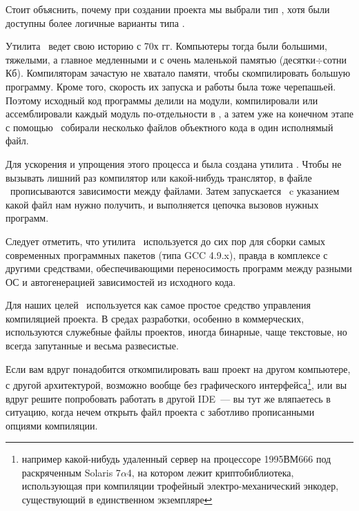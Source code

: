 \label{labmkmake}

Стоит объяснить, почему при создании проекта мы выбрали тип , хотя были доступны более логичные варианты типа .

Утилита \make\ ведет свою историю с 70х гг. Компьютеры тогда были большими,
тяжелыми, а главное медленными и с очень маленькой памятью (десятки$\div$сотни
Кб).
Компиляторам зачастую не хватало памяти, чтобы скомпилировать большую программу.
Кроме того, скорость их запуска и работы была тоже черепашьей.
Поэтому исходный код программы делили на модули, компилировали или
ассемблировали каждый модуль по-отдельности в , а затем уже
на конечном этапе с помощью \ собирали несколько файлов объектного
кода в один исполнямый файл.

Для ускорения и упрощения этого процесса и была создана утилита \make.
Чтобы не вызывать лишний раз компилятор или какой-нибудь транслятор, в файле
\makefile\ прописываются зависимости между файлами. Затем запускается \make\ c
указанием какой файл нам нужно получить, и выполняется цепочка вызовов
нужных программ.

Следует отметить, что утилита \make\ используется до сих пор для сборки самых
современных программных пакетов (типа GCC 4.9.x), правда в комплексе с другими
средствами, обеспечивающими переносимость программ между разными ОС и
автогенерацией зависимостей из исходного кода.

\bigskip
Для наших целей \make\ используется как самое простое средство управления
компиляцией проекта. В средах разработки, особенно в коммерческих,
используются служебные файлы проектов, иногда бинарные, чаще текстовые, но
всегда запутанные и весьма развесистые.

Если вам вдруг понадобится откомпилировать ваш проект на другом компьютере,
с другой архитектурой, возможно вообще без графического
интерфейса\footnote{например какой-нибудь удаленный сервер на
процессоре 1995ВМ666 под раскряченным Solaris 7$\alpha$4, на котором лежит
криптобиблиотека, использующая при компиляции трофейный электро-механический 
энкодер, существующий в единственном экземпляре \smiley}, или вы вдруг решите
попробовать работать в другой IDE\ --- вы тут же вляпаетесь в ситуацию, 
когда нечем открыть файл проекта с заботливо прописанными опциями
компиляции.

\bigskip
{}

